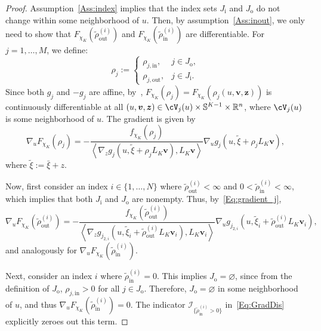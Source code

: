 \documentclass[%
onefignum,onetabnum]{siamonline250211}
\newcommand{\braket}[1]{\left\langle #1\right\rangle}
\newcommand{\bbR}{\mathbb R}
\newcommand{\bbS}{\mathbb S}
\newcommand{\cI}{\mathcal I} \newcommand{\cJ}{\mathcal J}
\begin{document}
\begin{proof}
    Assumption~\ref{Ass:index} implies that the index sets $J_{\mathrm{i}}$ and $J_{\mathrm{o}}$ do not change within some neighborhood of $u$. Then, by assumption~\ref{Ass:inout}, we only need to show that $F_{\chi_K}(\tilde{\rho}_{\mathrm{out}}^{(i)})$ and $F_{\chi_K}(\tilde{\rho}_{\mathrm{in}}^{(i)})$ are differentiable. For $j=1,\dots,M$, we define:
    \begin{equation*}
        \rho_j:=\left\{\begin{array}{ll}
            \rho_{j,\mathrm{in}}, & j\in J_{\mathrm{o}}, \\
            \rho_{j,\mathrm{out}}, & j\in J_{\mathrm{i}}.
        \end{array}\right.
    \end{equation*}
    Since both $g_j$ and $-g_j$ are affine, by~\cite[Cor.\ 3.2]{AcHeZi-AMO24}, $F_{\chi_K}(\rho_{j})=F_{\chi_K}(\rho_{j}(u,\boldsymbol{v},\boldsymbol{z}))$ is continuously differentiable at all $(u,\boldsymbol{v},\boldsymbol{z})\in \cV_j(u)\times \bbS^{K-1}\times \bbR^{n}$, where $\cV_j(u)$ is some neighborhood of $u$. The gradient is given by
    \begin{equation}\label{Eq:gradient_j}
        \nabla_u F_{\chi_K}(\rho_{j})=-\frac{f_{\chi_K}(\rho_{j})}{\braket{\nabla_z g_j(u,\tilde{\xi}+\rho_{j} L_K\boldsymbol{v}), L_K\boldsymbol{v}}}\nabla_u g_{j}(u,\tilde{\xi}+\rho_{j} L_K\boldsymbol{v}),
    \end{equation}
    where $\tilde{\xi}:=\bar{\xi}+z$.

    Now, first consider an index $i\in\{1,\dots,N\}$ where $\tilde{\rho}_{\mathrm{out}}^{(i)}<\infty$ and $0<\tilde{\rho}_{\mathrm{in}}^{(i)}<\infty$, which implies that both $J_{\mathrm{i}}$ and $J_{\mathrm{o}}$ are nonempty.
    Thus, by~\eqref{Eq:gradient_j},
    \begin{equation}\label{Eq:grad_rhoout}
        \nabla_u F_{\chi_K}(\tilde{\rho}_{\mathrm{out}}^{(i)}) = -\frac{f_{\chi_K}(\tilde{\rho}_{\mathrm{out}}^{(i)})}{\braket{\nabla_{z}g_{j_{2,i}}(u,\tilde{\xi}_i+\tilde{\rho}_{\mathrm{out}}^{(i)} L_K\boldsymbol{v}_i), L_K\boldsymbol{v}_i}}\nabla_u g_{j_{2,i}}(u,\tilde{\xi}_i+\tilde{\rho}_{\mathrm{out}}^{(i)} L_K\boldsymbol{v}_i),
    \end{equation}
    and analogously for $\nabla_u F_{\chi_K}(\tilde{\rho}_{\mathrm{in}}^{(i)})$.

    Next, consider an index $i$ where $\tilde{\rho}_{\mathrm{in}}^{(i)}=0$. This implies $J_{\mathrm{o}}=\varnothing$, since from the definition of $J_{\mathrm{o}}$, $\rho_{j,\mathrm{in}}>0$ for all $j\in J_{\mathrm{o}}$. Therefore, $J_{\mathrm{o}}=\varnothing$ in some neighborhood of $u$, and thus $\nabla_u F_{\chi_K}(\tilde{\rho}_{\mathrm{in}}^{(i)})=0$. The indicator $\cI_{\{\tilde{\rho}_{\mathrm{in}}^{(i)} > 0\}}$ in~\eqref{Eq:GradDis} explicitly zeroes out this term.


\end{proof}
\end{document}
